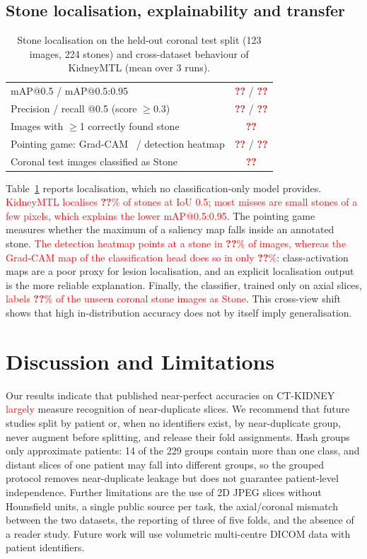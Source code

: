 \documentclass[conference]{IEEEtran}
\newcommand{\tbd}{\textcolor{red}{\textbf{??}}}            %
\newcommand{\finding}[1]{\textcolor{red}{#1}}             %
\begin{document}
\subsection{Stone localisation, explainability and transfer}
\begin{table}[t]
\centering
\caption{Stone localisation on the held-out coronal test split (123 images, 224 stones) and cross-dataset
behaviour of KidneyMTL (mean over 3 runs).}
\label{tab:det}
\small\setlength{\tabcolsep}{4pt}
\begin{tabular}{lc}
\toprule
mAP@0.5 / mAP@0.5:0.95 & \tbd{} / \tbd \\
Precision / recall @0.5 (score $\ge$0.3) & \tbd{} / \tbd \\
Images with $\ge$1 correctly found stone & \tbd \\
\midrule
Pointing game: Grad-CAM~\cite{selvaraju2017gradcam} / detection heatmap & \tbd{} / \tbd \\
Coronal test images classified as Stone & \tbd \\
\bottomrule
\end{tabular}
\end{table}

Table~\ref{tab:det} reports localisation, which no classification-only model provides.
\finding{KidneyMTL localises \tbd\% of stones at IoU 0.5; most misses are small stones of a few pixels, which
explains the lower mAP@0.5:0.95.} The pointing game~\cite{zhang2016topdown} measures whether the maximum of a
saliency map falls inside an annotated stone. \finding{The detection heatmap points at a stone in \tbd\% of
images, whereas the Grad-CAM map of the classification head does so in only \tbd\%}: class-activation maps
are a poor proxy for lesion localisation, and an explicit localisation output is the more reliable
explanation. Finally, the classifier, trained only on axial slices, \finding{labels \tbd\% of the unseen coronal
stone images as Stone}. This cross-view shift shows that high in-distribution accuracy does not by itself imply
generalisation.

\section{Discussion and Limitations}
Our results indicate that published near-perfect accuracies on CT-KIDNEY \finding{largely} measure recognition of
near-duplicate slices. We recommend that future studies split by patient or, when no identifiers exist, by
near-duplicate group, never augment before splitting, and release their fold assignments. Hash groups only
approximate patients: 14 of the 229 groups contain more than one class, and distant slices of one patient may
fall into different groups, so the grouped protocol removes near-duplicate leakage but does not guarantee
patient-level independence. Further limitations are the use of 2D JPEG slices without Hounsfield units, a single
public source per task, the axial/coronal mismatch between the two datasets, the reporting of three of five
folds, and the absence of a reader study. Future work will use volumetric multi-centre DICOM data with patient
identifiers.
\end{document}
